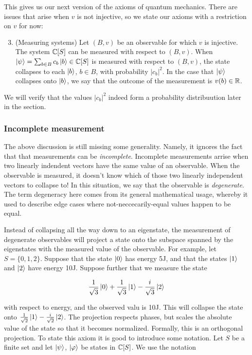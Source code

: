 This gives us our next version of the axioms of quantum mechanics. There are issues that arise when $v$ is not injective, so we state our axioms with a restriction on $v$ for now:

\begin{enumerate}[1'.]
\setcounter{enumi}{2}

\item (Measuring systems) Let $(B,v)$ be an observable for which $v$ is injective. The system $\mathbb{C}[S]$ can be measured with respect to $(B,v)$. When $\ket{\psi} = \sum_{b\in B} c_b \ket{b}\in \mathbb{C}[S]$ is measured with respect to $(B,v)$, the state collapses to each $\ket{b}$, $b\in B$, with probability $|c_b|^2$. In the case that $\ket{\psi}$ collapses onto $\ket{b}$, we say that the outcome of the measurement is $v(b)\in \mathbb{R}$.
\end{enumerate}


We will verify that the values $|c_b|^2$ indeed form a probability distribuution later in the section.

\subsubsection{Incomplete measurement}

The above discussion is still missing some generality. Namely, it ignores the fact that that measurements can be \textit{incomplete}. Incomplete measurements arrise when two linearly indendent vectors have the same value of an observable. When the observable is measured, it doesn't know which of those two linearly independent vectors to collapse to! In this situation, we say that the observable is \textit{degenerate}. The term degeneracy here comes from its general mathematical usage, whereby it used to describe edge cases where not-neccecarily-equal values happen to be equal.

Instead of collapsing all the way down to an eigenstate, the measurement of degenerate observables will project a state onto the subspace spanned by the eigenstates with the measured value of the observable. For example, let $S=\{0,1,2\}$. Suppose that the state $\left|0\right>$ has energy 5J, and that the states $\left|1\right>$ and $\ket{2}$ have energy 10J. Suppose further that we measure the state

$$\frac{1}{\sqrt{3}}\left|0\right>+\frac{1}{\sqrt{3}}\left|1\right>-\frac{i}{\sqrt{3}}\ket{2}$$

with respect to energy, and the observed valu is 10J. This will collapse the state onto $\frac{1}{\sqrt{2}}\left|1\right>-\frac{i}{\sqrt{2}}\ket{2}$. The projection respects phases, but scales the absolute value of the state so that it becomes normalized. Formally, this is an orthogonal projection. To state this axiom it is good to introduce some notation. Let $S$ be a finite set and let $\ket{\psi}$, $\ket{\varphi}$ be states in $\mathbb{C}[S]$. We use the notation

